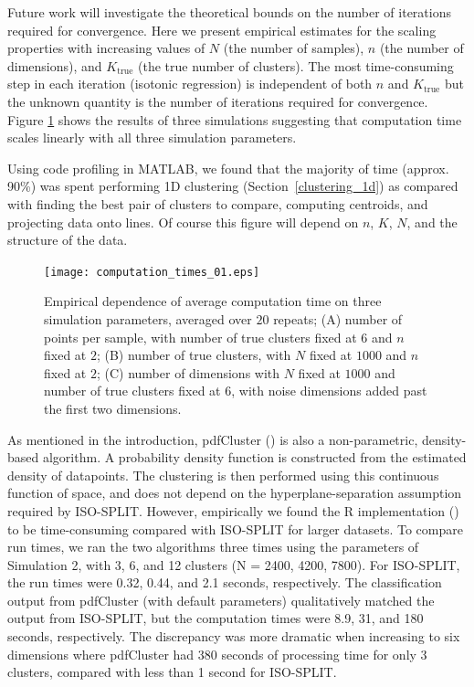 \documentclass[10pt]{article}
\begin{document}
Future work will investigate the theoretical bounds on the number of iterations required for convergence. Here we present empirical estimates for the scaling properties with increasing values of $N$ (the number of samples), $n$ (the number of dimensions), and $K_\text{true}$ (the true number of clusters). The most time-consuming step in each iteration (isotonic regression) is independent of both $n$ and $K_\text{true}$ but the unknown quantity is the number of iterations required for convergence. Figure \ref{fig:computation_times_01} shows the results of three simulations suggesting that computation time scales linearly with all three simulation parameters.

Using code profiling in MATLAB, we found that the majority of time (approx. 90\%) was spent performing 1D clustering (Section~\ref{clustering_1d}) as compared with finding the best pair of clusters to compare, computing centroids, and projecting data onto lines. Of course this figure will depend on $n$, $K$, $N$, and the structure of the data.

\begin{figure}
\begin{center}
\texttt{[image: computation\_times\_01.eps]}
\end{center}
\caption{
Empirical dependence of average computation time on three simulation parameters, averaged over $20$ repeats; (A) number of points per sample, with number of true clusters fixed at $6$ and $n$ fixed at $2$; (B) number of true clusters, with $N$ fixed at $1000$ and $n$ fixed at $2$; (C) number of dimensions with $N$ fixed at $1000$ and number of true clusters fixed at $6$, with noise dimensions added past the first two dimensions.
}
\label{fig:computation_times_01}
\end{figure}

As mentioned in the introduction, pdfCluster (\cite{pdfcluster}) is also a non-parametric, density-based algorithm. A probability density function is constructed from the estimated density of datapoints. The clustering is then performed using this continuous function of space, and does not depend on the hyperplane-separation assumption required by ISO-SPLIT. However, empirically we found the R implementation (\cite{pdfclusterR}) to be time-consuming compared with ISO-SPLIT for larger datasets. To compare run times, we ran the two algorithms three times using the parameters of Simulation 2, with 3, 6, and 12 clusters (N = 2400, 4200, 7800). For ISO-SPLIT, the run times were 0.32, 0.44, and 2.1 seconds, respectively. The classification output from pdfCluster (with default parameters) qualitatively matched the output from ISO-SPLIT, but the computation times were 8.9, 31, and 180 seconds, respectively. The discrepancy was more dramatic when increasing to six dimensions where pdfCluster had 380 seconds of processing time for only 3 clusters, compared with less than 1 second for ISO-SPLIT.
\end{document}

